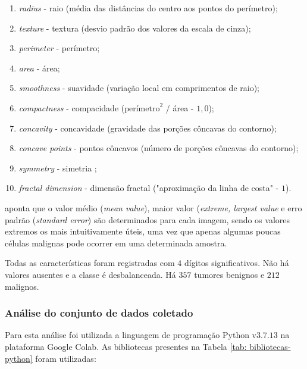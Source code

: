\begin{enumerate}
    \item \textit{radius} - raio (média das distâncias do centro aos pontos do perímetro);
	\item \textit{texture} - textura (desvio padrão dos valores da escala de cinza);
	\item \textit{perimeter} - perímetro;
	\item \textit{area} - área;
	\item \textit{smoothness} - suavidade (variação local em comprimentos de raio);
	\item \textit{compactness} - compacidade ($\text{perímetro}^2$ / área - $1,0$);
	\item \textit{concavity} - concavidade (gravidade das porções côncavas do contorno);
	\item \textit{concave points} - pontos côncavos (número de porções côncavas do contorno);
	\item \textit{symmetry} - simetria ;
	\item \textit{fractal dimension} - dimensão fractal ("aproximação da linha de costa" - $1$).
\end{enumerate}

\cite{street_nuclear_1999} aponta que o valor médio (\textit{mean value}), maior valor (\textit{extreme, largest value} e erro padrão (\textit{standard error}) são determinados para cada imagem, sendo os valores extremos os mais intuitivamente úteis, uma vez que apenas algumas poucas células malignas pode ocorrer em uma determinada amostra.

Todas as características foram registradas com $4$ dígitos significativos. Não há valores ausentes e a classe é desbalanceada. Há $357$ tumores benignos e $212$ malignos.

\subsubsection{Análise do conjunto de dados coletado}

Para esta análise foi utilizada a linguagem de programação Python v$3.7.13$ na plataforma Google Colab. As bibliotecas  presentes na Tabela \ref{tab: bibliotecas-python} foram utilizadas:




